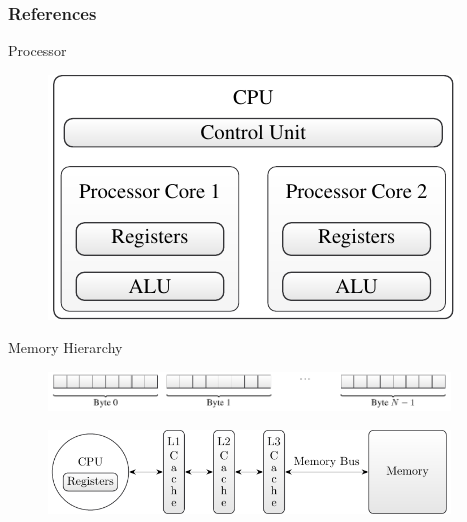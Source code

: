 \documentclass[aspectratio=169]{beamer}
\begin{document}
  \begin{frame}
    \frametitle{References}
  \end{frame}

  \appendix

  \begin{frame}{Processor}
    \begin{figure}
      \includegraphics[height=0.5\textheight]{figures/cpu_components.pdf}
    \end{figure}
  \end{frame}

  \begin{frame}{Memory Hierarchy}
    \begin{figure}
      \includegraphics[width=0.95\textwidth]{figures/memory.pdf}
    \end{figure}
    \begin{figure}
      \includegraphics[width=0.95\textwidth]{figures/memory_hierarchy.pdf}
    \end{figure}
  \end{frame}
\end{document}
